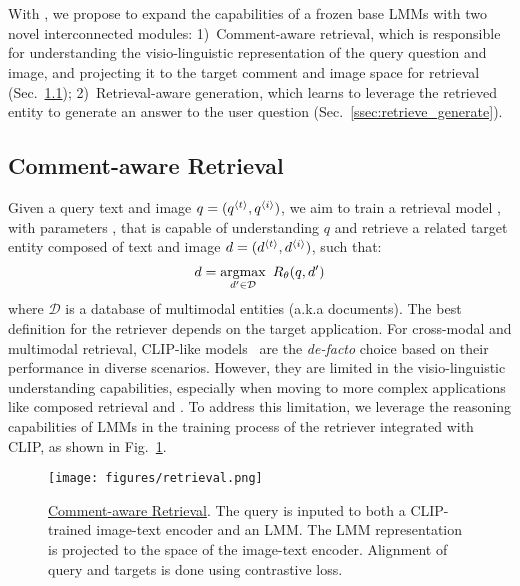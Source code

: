 \section{\modelname}
\label{sec:method}

With \modelname, we propose to expand the capabilities of a frozen base LMMs with two novel interconnected modules: 
%
1)~Comment-aware retrieval, which is responsible for understanding the visio-linguistic representation of the query question and image, and projecting it to the target comment and image space for retrieval (Sec.~\ref{ssec:comment_retrieval}); 
2)~Retrieval-aware generation, which learns to leverage the retrieved entity to generate an answer to the user question (Sec.~\ref{ssec:retrieve_generate}).

\subsection{Comment-aware Retrieval}
\label{ssec:comment_retrieval}

Given a query text and image $q = (q^{{\langle t\rangle}}, q^{{\langle i\rangle}})$, we aim to train a retrieval model \retriever, with parameters \retrieverparams, that is capable of understanding $q$ and retrieve a related target entity composed of text and image $d = (d^{{\langle t\rangle}}, d^{{\langle i\rangle}})$, such that:
\begin{equation}
    d = \operatorname*{argmax}_{d' \in \mathcal{D}}~{R_\theta(q, d')} \label{eq:retrieval}
\end{equation}
where $\mathcal{D}$ is a database of multimodal entities (a.k.a documents).
The best definition for the retriever \retriever depends on the target application.
For cross-modal and multimodal retrieval, CLIP-like models~\cite{radford2021clip, gao2023softclip, gao2022pyramidclip, ilharco2021openclip, wei2023uniir} are the \emph{de-facto} choice based on their 
%
performance in diverse scenarios. %
However, they are limited in the visio-linguistic understanding capabilities, especially when moving to more complex applications like composed retrieval and \taskname.
To address this limitation, we leverage the reasoning capabilities of LMMs in the training process of the retriever integrated with CLIP, as shown in Fig.~\ref{fig:comment_retrieval}.

\begin{figure}[t]
  \centering
   \texttt{[image: figures/retrieval.png]}
   \vspace{-3mm}
   \caption{\underline{Comment-aware Retrieval}. The query is inputed to both a CLIP-trained image-text encoder and an LMM. The LMM representation is projected to the space of the image-text encoder. Alignment of query and targets is done using contrastive loss.}
   \label{fig:comment_retrieval}
   \vspace{-3mm}
\end{figure}


